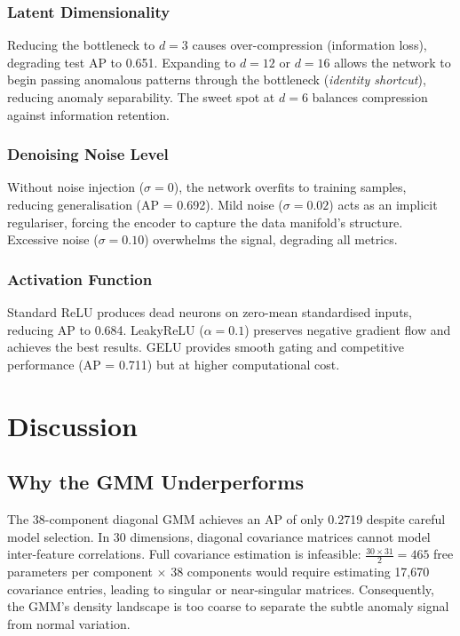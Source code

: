 \documentclass[conference,10pt]{IEEEtran}
\begin{document}
\subsubsection{Latent Dimensionality}
Reducing the bottleneck to $d = 3$ causes over-compression (information loss),
degrading test AP to 0.651.  Expanding to $d = 12$ or $d = 16$ allows the
network to begin passing anomalous patterns through the bottleneck
(\emph{identity shortcut}), reducing anomaly separability.  The sweet spot
at $d = 6$ balances compression against information retention.

\subsubsection{Denoising Noise Level}
Without noise injection ($\sigma = 0$), the network overfits to training
samples, reducing generalisation (AP = 0.692).  Mild noise ($\sigma = 0.02$)
acts as an implicit regulariser, forcing the encoder to capture the data
manifold's structure.  Excessive noise ($\sigma = 0.10$) overwhelms the
signal, degrading all metrics.

\subsubsection{Activation Function}
Standard ReLU produces dead neurons on zero-mean standardised inputs, reducing
AP to 0.684.  LeakyReLU ($\alpha = 0.1$) preserves negative gradient flow and
achieves the best results.  GELU provides smooth gating and competitive
performance (AP = 0.711) but at higher computational cost.

\section{Discussion}
\label{sec:discussion}

\subsection{Why the GMM Underperforms}
The 38-component diagonal GMM achieves an AP of only 0.2719 despite careful
model selection.  In 30 dimensions, diagonal covariance matrices cannot model
inter-feature correlations.  Full covariance estimation is infeasible:
$\frac{30 \times 31}{2} = 465$ free parameters per component $\times$ 38
components would require estimating 17,670 covariance entries, leading to
singular or near-singular matrices.  Consequently, the GMM's density landscape
is too coarse to separate the subtle anomaly signal from normal variation.
\end{document}
